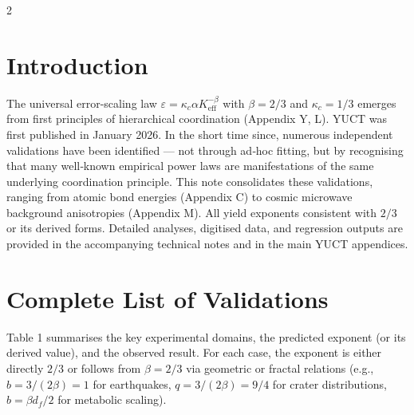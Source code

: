 \documentclass[11pt,a4paper]{article}
\newcommand{\eps}{\varepsilon}
\newcommand{\kappac}{\kappa_c}
\newcommand{\Keff}{K_{\mathrm{eff}}}
\newcommand{\betaf}{\beta}
\begin{document}
	\vspace{0.4cm}
	\vspace*{-\baselineskip}
	\begin{multicols}{2}
		
		\section{Introduction}
		
		The universal error-scaling law \(\eps = \kappac \alpha \Keff^{-\betaf}\) with \(\betaf = 2/3\) and \(\kappac = 1/3\) emerges from first principles of hierarchical coordination (Appendix Y, L). YUCT was first published in January 2026. In the short time since, numerous independent validations have been identified — not through ad‑hoc fitting, but by recognising that many well‑known empirical power laws are manifestations of the same underlying coordination principle. This note consolidates these validations, ranging from atomic bond energies (Appendix C) to cosmic microwave background anisotropies (Appendix M). All yield exponents consistent with \(2/3\) or its derived forms. Detailed analyses, digitised data, and regression outputs are provided in the accompanying technical notes \cite{TN1,TN2,TN3,TN4,TN5} and in the main YUCT appendices.
		
		\section{Complete List of Validations}
		
		Table 1 summarises the key experimental domains, the predicted exponent (or its derived value), and the observed result. For each case, the exponent is either directly \(2/3\) or follows from \(\betaf = 2/3\) via geometric or fractal relations (e.g., \(b = 3/(2\betaf) = 1\) for earthquakes, \(q = 3/(2\betaf) = 9/4\) for crater distributions, \(b = \betaf d_f/2\) for metabolic scaling).
		

\end{multicols}
\end{document}
